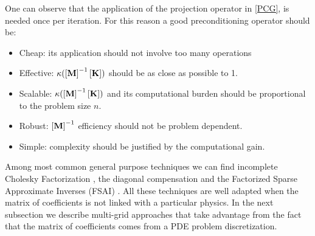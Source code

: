 One can observe that the application of the projection operator in \ref{PCG}, is needed once per iteration. For this reason a good preconditioning operator should be:
\begin{itemize}
\item Cheap: its application should not involve too many operations
\item Effective: $\kappa(\left[{\mathbf{M}}\right]^{-1}\left[{\mathbf{K}}\right])$ should be as close as possible to 1.
\item Scalable:  $\kappa(\left[{\mathbf{M}}\right]^{-1}\left[{\mathbf{K}}\right])$ and its computational burden should be proportional to the problem size $n$.
\item Robust:  $\left[{\mathbf{M}}\right]^{-1}$ efficiency should not be problem dependent.
\item Simple:  complexity should be justified by the computational gain.
\end{itemize}
Among most common general purpose techniques we can find incomplete Cholesky Factorization \cite{kershaw1978incomplete}, the diagonal compensation \cite{jacobi1845ueber} and the Factorized Sparse Approximate Inverses (FSAI) \cite{buleev1960numerical,buleev1960numerical,meijerink1977iterative,il1992iterative,varga1960boundary}. All these techniques are well adapted when the matrix of coefficients is not linked with a particular physics. In the next subsection we describe multi-grid approaches that take advantage from the fact that the matrix of coefficients comes from a PDE problem discretization.
